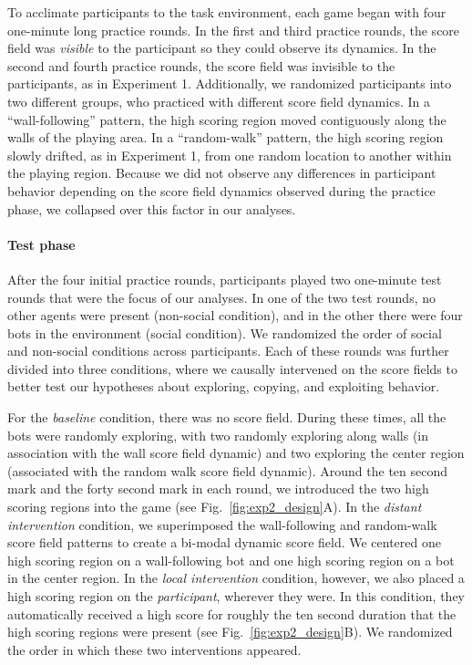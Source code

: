 \documentclass[12pt,letterpaper]{article}
\begin{document}
To acclimate participants to the task environment, each game began with four one-minute long practice rounds. 
In the first and third practice rounds, the score field was \emph{visible} to the participant so they could observe its dynamics.
In the second and fourth practice rounds, the score field was invisible to the participants, as in Experiment 1. 
Additionally, we randomized participants into two different groups, who practiced with different score field dynamics. 
In a ``wall-following'' pattern, the high scoring region moved contiguously along the walls of the playing area. 
In a ``random-walk'' pattern, the high scoring region slowly drifted, as in Experiment 1, from one random location to another within the playing region.
Because we did not observe any differences in participant behavior depending on the score field dynamics observed during the practice phase, we collapsed over this factor in our analyses.

\paragraph{Test phase}

After the four initial practice rounds, participants played two one-minute test rounds that were the focus of our analyses. 
In one of the two test rounds, no other agents were present (non-social condition), and in the other there were four bots in the environment (social condition). 
We randomized the order of social and non-social conditions across participants. 
Each of these rounds was further divided into three conditions, where we causally intervened on the score fields to better test our hypotheses about exploring, copying, and exploiting behavior. 

For the \emph{baseline} condition, there was no score field. During these times, all the bots were randomly exploring, with two randomly exploring along walls (in association with the wall score field dynamic) and two exploring the center region (associated with the random walk score field dynamic). 
Around the ten second mark and the forty second mark in each round, we introduced the two high scoring regions into the game (see Fig.~\ref{fig:exp2_design}A).
In the \textit{distant intervention} condition, we superimposed the wall-following and random-walk score field patterns to create a bi-modal dynamic score field. 
We centered one high scoring region on a wall-following bot and one high scoring region on a bot in the center region. 
In the \textit{local intervention} condition, however, we also placed a high scoring region on the \emph{participant}, wherever they were. 
In this condition, they automatically received a high score for roughly the ten second duration that the high scoring regions were present (see Fig.~\ref{fig:exp2_design}B).
We randomized the order in which these two interventions appeared.
\end{document}
